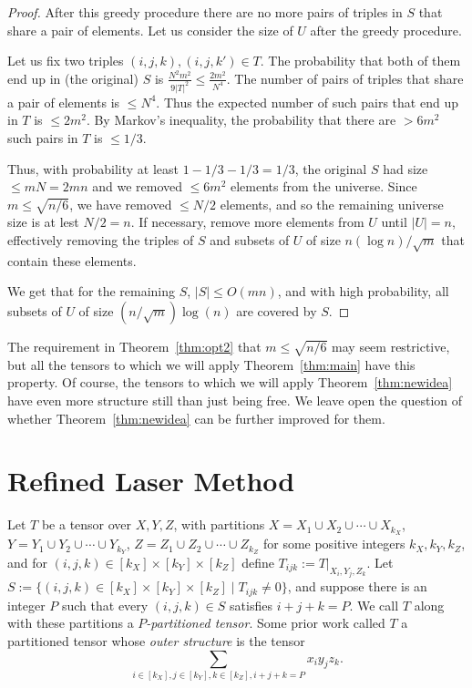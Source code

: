 \PassOptionsToPackage{shortlabels}{enumitem}\documentclass[10pt,a4paper]{article}
\begin{document}
\begin{proof}
After this greedy procedure there are no more pairs of triples in $S$ that share a pair of elements.
Let us consider the size of $U$ after the greedy procedure.

Let us fix two triples $(i,j,k),(i,j,k')\in T$. The probability that both of them end up in (the original) $S$ is $\frac{N^2 m^2}{9|T|^2}\leq \frac{2m^2}{N^4}$. The number of pairs of triples that share a pair of elements is $\leq N^4$. Thus the expected number of such pairs that end up in $T$ is $\leq 2m^2$.
By Markov's inequality, the probability that there are $> 6m^2$ such pairs in $T$ is $\leq 1/3$. 

Thus, with probability at least $1-1/3-1/3 = 1/3$, the original $S$ had size $\leq mN=2mn$ and we removed $\leq 6m^2$ elements from the universe. Since $m\leq \sqrt{n/6}$, we have removed $\leq N/2$ elements, and so the remaining universe size is at lest $N/2=n$. 
If necessary, remove more elements from $U$ until $|U|=n$, effectively removing the triples of $S$ and subsets of $U$ of size $n(\log n)/\sqrt m$ that contain these elements.

We get that for the remaining $S$,  $|S|\leq O(mn)$, and with high probability, all subsets of $U$ of size $(n/\sqrt{m})\log (n)$ are covered by $S$.
\end{proof}

The requirement in Theorem~\ref{thm:opt2} that $m \leq \sqrt{n/6}$ may seem restrictive, but all the tensors to which we will apply Theorem~\ref{thm:main} have this property. Of course, the tensors to which we will apply Theorem~\ref{thm:newidea} have even more structure still than just being free. We leave open the question of whether Theorem~\ref{thm:newidea} can be further improved for them.





\section{Refined Laser Method} \label{sec:proof}

Let $T$ be a tensor over $X,Y,Z$, with partitions $X = X_1 \cup X_2 \cup \cdots \cup X_{k_X}$, $Y = Y_1 \cup Y_2 \cup \cdots \cup Y_{k_Y}$, $Z = Z_1 \cup Z_2 \cup \cdots \cup Z_{k_Z}$ for some positive integers $k_X,k_Y,k_Z$, and for $(i,j,k) \in [k_X]\times[k_Y]\times[k_Z]$ define $T_{ijk} := T|_{X_i,Y_j,Z_k}$. Let $S := \{ (i,j,k) \in [k_X]\times[k_Y]\times[k_Z] \mid T_{ijk} \neq 0\}$, and suppose there is an integer $P$ such that every $(i,j,k) \in S$ satisfies $i+j+k=P$. We call $T$ along with these partitions a \emph{$P$-partitioned tensor}. Some prior work called $T$ a partitioned tensor whose \emph{outer structure} is the tensor $$\sum_{i \in [k_X], j\in [k_Y], k \in [k_Z], i+j+k=P} x_iy_jz_k.$$
\end{document}
